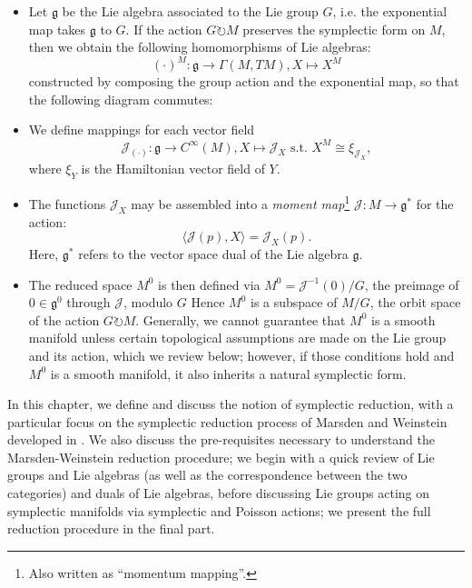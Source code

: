\documentclass{tufte-handout}
\begin{document}
\begin{itemize}
\item Let $\mathfrak{g}$ be the Lie algebra associated to the Lie group $G$, i.e. the exponential map takes $\mathfrak{g}$ to $G$. If the action $G \circlearrowright M$ preserves the symplectic form on $M$, then we obtain the following homomorphisms of Lie algebras:
$$
(\cdot)^M : \mathfrak{g} \to \Gamma(M,TM), X \mapsto X^M
$$
constructed by composing the group action and the exponential map, so that the following diagram commutes:


\item We define mappings for each vector field
$$
\mathcal{J}_{(\cdot)}: \mathfrak{g} \to C^\infty(M), X \mapsto \mathcal{J}_X \mbox{ s.t. } X^M \cong \xi_{\mathcal{J}_X},
$$
where $\xi_Y$ is the Hamiltonian vector field of $Y$.

\item The functions $\mathcal{J}_X$ may be assembled into a \emph{moment map}\footnote{Also written as ``momentum mapping''.} $\mathcal{J}: M \to \mathfrak{g}^*$ for the action:
$$
\langle \mathcal{J}(p) , X \rangle = \mathcal{J}_X(p).
$$
Here, $\mathfrak{g}^*$ refers to the vector space dual of the Lie algebra $\mathfrak{g}$.

\item The reduced space $M^0$ is then defined via $M^0 = \mathcal{J}^{-1}(0) / G$, the preimage of $0 \in \mathfrak{g}^0$ through $\mathcal{J}$, modulo $G$ Hence $M^0$ is a subspace of $M / G$, the orbit space of the action $G \circlearrowright M$. Generally, we cannot guarantee that $M^0$ is a smooth manifold unless certain topological assumptions are made on the Lie group and its action, which we review below; however, if those conditions hold and $M^0$ is a smooth manifold, it also inherits a natural symplectic form.
\end{itemize}

In this chapter, we define and discuss the notion of symplectic reduction, with a particular focus on the symplectic reduction process of Marsden and Weinstein developed in \cite{marsdenweinstein}. We also discuss the pre-requisites necessary to understand the Marsden-Weinstein reduction procedure; we begin with a quick review of Lie groups and Lie algebras (as well as the correspondence between the two categories) and duals of Lie algebras, before discussing Lie groups acting on symplectic manifolds via symplectic and Poisson actions; we present the full reduction procedure in the final part.
\end{document}
